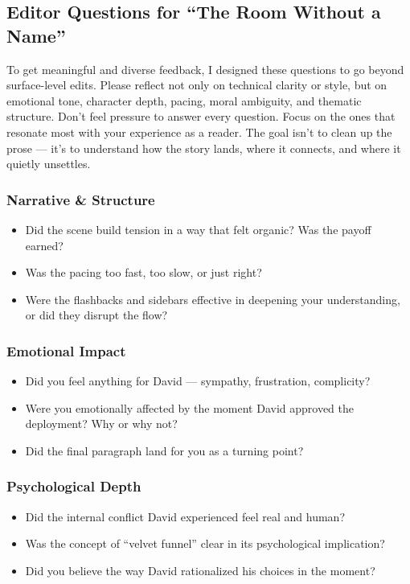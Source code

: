 \subsection{Editor Questions for ``The Room Without a Name''}

To get meaningful and diverse feedback, I designed these questions to go beyond surface-level edits. 
Please reflect not only on technical clarity or style, but on emotional tone, character depth, pacing, 
moral ambiguity, and thematic structure. Don’t feel pressure to answer every question. Focus on the 
ones that resonate most with your experience as a reader. The goal isn’t to clean up the prose — it’s 
to understand how the story lands, where it connects, and where it quietly unsettles.

\subsubsection{Narrative \& Structure}

\begin{itemize}
  \item Did the scene build tension in a way that felt organic? Was the payoff earned?
  \item Was the pacing too fast, too slow, or just right?
  \item Were the flashbacks and sidebars effective in deepening your understanding, or did they disrupt the flow?
\end{itemize}

\subsubsection{Emotional Impact}

\begin{itemize}
  \item Did you feel anything for David — sympathy, frustration, complicity?
  \item Were you emotionally affected by the moment David approved the deployment? Why or why not?
  \item Did the final paragraph land for you as a turning point?
\end{itemize}

\subsubsection{Psychological Depth}

\begin{itemize}
  \item Did the internal conflict David experienced feel real and human?
  \item Was the concept of “velvet funnel” clear in its psychological implication?
  \item Did you believe the way David rationalized his choices in the moment?
\end{itemize}

